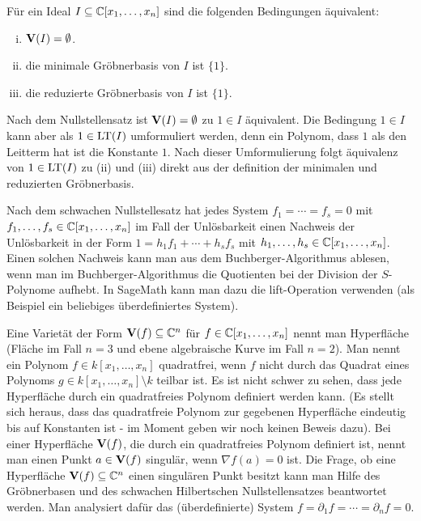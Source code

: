 \documentclass[11pt]{article}
\numberwithin{equation}{section}
\begin{document}
\begin{corollary}
	Für ein Ideal $I \subseteq \mathbb{C}[x_1,\ldots,x_n]$ sind die folgenden Bedingungen äquivalent: 
	\begin{enumerate}[(i)]
		\item $\mathbf{V}(I) = \emptyset$. 
		\item die minimale Gröbnerbasis von $I$ ist $\{1\}$. 
		\item die reduzierte Gröbnerbasis von $I$ ist $\{1\}$. 
	\end{enumerate} 
\end{corollary} 
\begin{remark}
	Nach dem Nullstellensatz ist $\mathbf{V}(I) = \emptyset$ zu $1 \in I $ äquivalent. Die Bedingung $1 \in I$ kann aber als $1 \in \operatorname{LT}(I)$ umformuliert werden, denn ein Polynom, dass $1$ als den Leitterm hat ist die Konstante $1$. Nach dieser Umformulierung folgt äquivalenz von $1 \in \operatorname{LT}(I)$ zu (ii) und (iii) direkt aus der definition der minimalen und reduzierten Gröbnerbasis. 
\end{remark} 

\begin{beispiel} 
	Nach dem schwachen Nullstellesatz hat jedes System $f_1= \cdots = f_s =0$ mit $f_1,\ldots, f_s \in \mathbb{C}[x_1,\ldots,x_n]$ im Fall der Unlösbarkeit einen Nachweis der Unlösbarkeit in der Form $1 = h_1 f_1 + \cdots + h_s f_s$ mit $h_1,\ldots, h_s \in \mathbb{C}[x_1,\ldots,x_n]$. Einen solchen Nachweis kann man aus dem Buchberger-Algorithmus ablesen, wenn man im Buchberger-Algorithmus die Quotienten bei der Division der $S$-Polynome aufhebt. In SageMath kann man dazu die lift-Operation verwenden (als Beispiel ein beliebiges überdefiniertes System). 
\end{beispiel} 


\begin{remark}
	Eine Varietät der Form $\mathbf{V}(f) \subseteq \mathbb{C}^n$ für $f \in \mathbb{C}[x_1,\ldots,x_n]$ nennt man Hyperfläche (Fläche im Fall $n=3$ und ebene algebraische Kurve im Fall $n=2$). 
	Man nennt ein Polynom $f \in k[x_1,\ldots,x_n]$ quadratfrei, wenn $f$ nicht durch das Quadrat eines Polynoms $g \in k[x_1,\ldots,x_n] \setminus k$ teilbar ist. Es ist nicht schwer zu sehen, dass jede Hyperfläche durch ein quadratfreies Polynom definiert werden kann. (Es stellt sich heraus, dass das quadratfreie Polynom zur gegebenen Hyperfläche eindeutig bis auf Konstanten ist - im Moment geben wir noch keinen Beweis dazu). Bei einer Hyperfläche $\mathbf{V}(f)$, die durch ein quadratfreies Polynom definiert ist, nennt man einen Punkt $a \in \mathbf{V}(f)$ singulär, wenn $\nabla f(a) = 0$ ist. Die Frage, ob eine Hyperfläche $\mathbf{V}(f) \subseteq \mathbb{C}^n$ einen singulären Punkt besitzt kann man Hilfe des Gröbnerbasen und des schwachen Hilbertschen Nullstellensatzes beantwortet werden. Man analysiert dafür das (überdefinierte) System $f = \partial_1 f = \cdots = \partial_n f = 0$. 
\end{remark}
\end{document}
